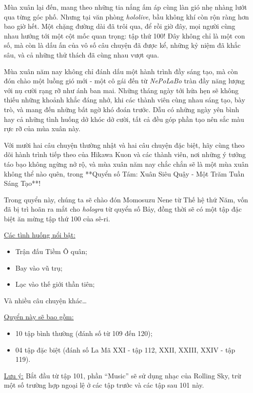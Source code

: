 \documentclass[main.tex]{subfiles}
\begin{document}
Mùa xuân lại đến, mang theo những tia nắng ấm áp cùng làn gió nhẹ nhàng lướt qua từng góc phố. Nhưng tại văn phòng \textit{hololive}, bầu không khí còn rộn ràng hơn bao giờ hết. Một chặng đường dài đã trôi qua, để rồi giờ đây, mọi người cùng nhau hướng tới một cột mốc quan trọng: tập thứ 100! Đây không chỉ là một con số, mà còn là dấu ấn của vô số câu chuyện đã được kể, những kỷ niệm đã khắc sâu, và cả những thử thách đã cùng nhau vượt qua.

Mùa xuân năm nay không chỉ đánh dấu một hành trình đầy sáng tạo, mà còn đón chào một luồng gió mới - một cô gái đến từ \textit{NePoLaBo} tràn đầy năng lượng với nụ cười rạng rỡ như ánh ban mai. Những tháng ngày tới hứa hẹn sẽ không thiếu những khoảnh khắc đáng nhớ, khi các thành viên cùng nhau sáng tạo, bày trò, và mang đến những bất ngờ khó đoán trước. Dẫu có những ngày yên bình hay cả những tình huống dở khóc dở cười, tất cả đều góp phần tạo nên sắc màu rực rỡ của mùa xuân này.

Với mười hai câu chuyện thường nhật và hai câu chuyện đặc biệt, hãy cùng theo dõi hành trình tiếp theo của Hikawa Kuon và các thành viên, nơi những ý tưởng táo bạo không ngừng nở rộ, và mùa xuân năm nay chắc chắn sẽ là một mùa xuân không thể nào quên, trong **Quyển số Tám: Xuân Siêu Quậy - Một Trăm Tuần Sáng Tạo**!

Trong quyển này, chúng ta sẽ chào đón Momosuzu Nene từ Thế hệ thứ Năm, vốn đã bị trì hoãn ra mắt cho \textit{hologra} từ quyển số Bảy, đồng thời sẽ có một tập đặc biệt ăn mừng tập thứ 100 của sê-ri.

\underline{Các tình huống nổi bật:}
\begin{itemize}
  \item Trận đấu Tiềm Ô quân;
  \item Bay vào vũ trụ;
  \item Lạc vào thế giới thần tiên;
\end{itemize}
Và nhiều câu chuyện khác\dots

\underline{Quyển này sẽ bao gồm:}
\begin{itemize}
\item 10 tập bình thường (đánh số từ 109 đến 120);
\item 04 tập đặc biệt (đánh số La Mã XXI - tập 112, XXII, XXIII, XXIV - tập 119).
\end{itemize}

\underline{Lưu ý:}  Bắt đầu từ tập 101, phần ``Music'' sẽ sử dụng nhạc của {\sen Rolling Sky}, trừ một số trường hợp ngoại lệ ở các tập trước và các tập sau 101 này.
\end{document}
